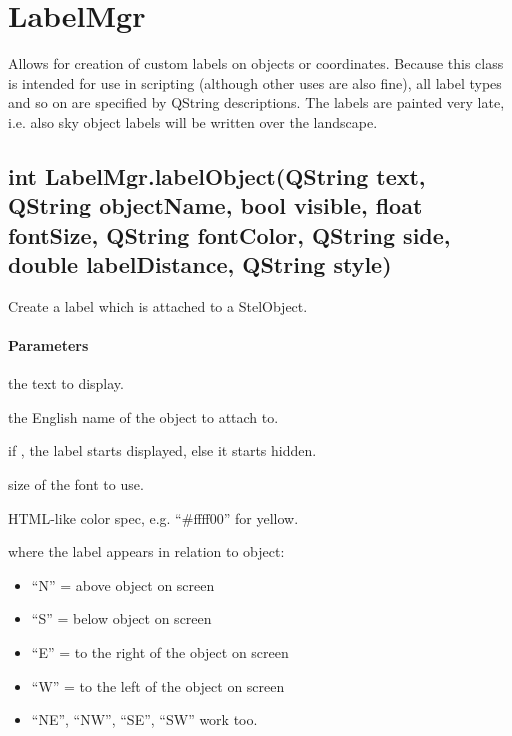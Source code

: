 \section{LabelMgr}
\label{sec:ScriptingAPI:LabelMgr}
Allows for creation of custom labels on objects or coordinates. Because this class is intended for use in scripting (although other uses are also fine), all label types and so on are specified by QString descriptions. The labels are painted very late, i.e. also sky object labels will be written over the landscape.

\subsection{int LabelMgr.labelObject(QString text, QString objectName, bool visible, float fontSize, QString fontColor, QString side, double labelDistance, QString style)}
\label{sec:ScriptingAPI:LabelMgr:labelObject}
Create a label which is attached to a StelObject.

\paragraph{Parameters}
\begin{description}[align=right,labelwidth=3cm,leftmargin=3.2cm]
\item[\parameter{text}] the text to display.
\item[\parameter{objectName}] the English name of the object to attach to.
\item[\parameter{visible}] if , the label starts displayed, else it starts hidden.
\item[\parameter{fontSize}] size of the font to use.
\item[\parameter{fontColor}] HTML-like color spec, e.g. ``\#ffff00'' for yellow.
\item[\parameter{side}] where the label appears in relation to object: \begin{itemize}
\item ``N'' = above object on screen
\item ``S'' = below object on screen
\item ``E'' = to the right of the object on screen
\item ``W'' = to the left of the object on screen
\item ``NE'', ``NW'', ``SE'', ``SW'' work too.
\end{itemize}
\item[\parameter{labelDistance}] 
\item[\parameter{style}] 
\end{description}

